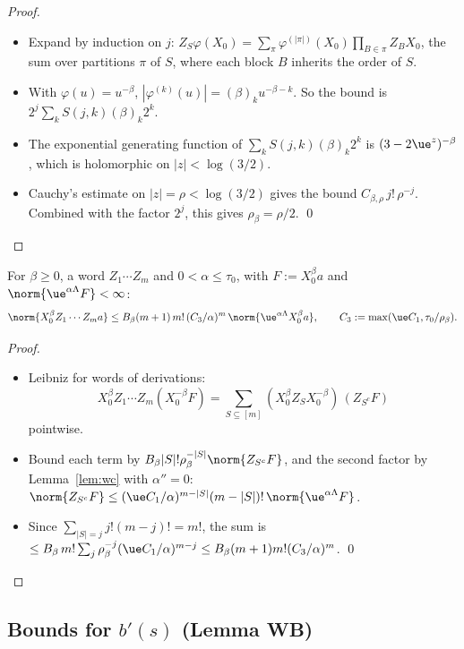 \begin{proof}
\begin{itemize}
\item Expand by induction on $j$: $Z_S\varphi(X_0)=\sum_{\pi}\varphi^{(|\pi|)}(X_0)\prod_{B\in\pi}Z_BX_0$, the sum over partitions $\pi$ of $S$, where each block $B$ inherits the order of $S$.
\item With $\varphi(u)=u^{-\beta}$, $|\varphi^{(k)}(u)|=(\beta)_ku^{-\beta-k}$. So the bound is $2^j\sum_kS(j,k)(\beta)_k2^k$.
\item The exponential generating function of $\sum_kS(j,k)(\beta)_k2^k$ is $(3-2\ue^z)^{-\beta}$, which is holomorphic on $|z|<\log(3/2)$.
\item Cauchy's estimate on $|z|=\rho<\log(3/2)$ gives the bound $C_{\beta,\rho}\,j!\,\rho^{-j}$. Combined with the factor $2^j$, this gives $\rho_\beta=\rho/2$. \qed
\end{itemize}
\end{proof}

\begin{lemma}[SC]\label{lem:sc}
For $\beta\ge0$, a word $Z_1\cdots Z_m$ and $0<\alpha\le\tau_0$, with $F:=X_0^\beta a$ and $\norm{\ue^{\alpha\Lambda}F}<\infty$:
\[
\norm{X_0^\beta Z_1\cdots Z_m a}\le B_\beta(m+1)\,m!\,(C_3/\alpha)^m\,\norm{\ue^{\alpha\Lambda}X_0^\beta a},
\qquad C_3:=\max(\ue C_1,\tau_0/\rho_\beta).
\]
\end{lemma}

\begin{proof}
\begin{itemize}
\item Leibniz for words of derivations: \[X_0^\beta Z_1\cdots Z_m(X_0^{-\beta}F)=\sum_{S\subseteq[m]}(X_0^\beta Z_SX_0^{-\beta})\,(Z_{S^c}F)\]
pointwise.
\item Bound each term by $B_\beta|S|!\rho_\beta^{-|S|}\norm{Z_{S^c}F}$, and the second factor by Lemma~\ref{lem:wc} with $\alpha''=0$: $\norm{Z_{S^c}F}\le(\ue C_1/\alpha)^{m-|S|}(m-|S|)!\,\norm{\ue^{\alpha\Lambda}F}$.
\item Since $\sum_{|S|=j}j!(m-j)!=m!$, the sum is $\le B_\beta\,m!\sum_j\rho_\beta^{-j}(\ue C_1/\alpha)^{m-j}\le B_\beta(m+1)m!(C_3/\alpha)^m$. \qed
\end{itemize}
\end{proof}

\subsection{\texorpdfstring{Bounds for $b'(s)$ (Lemma WB)}{Bounds for b'(s) (Lemma WB)}}\label{subsec:dd-wb}

